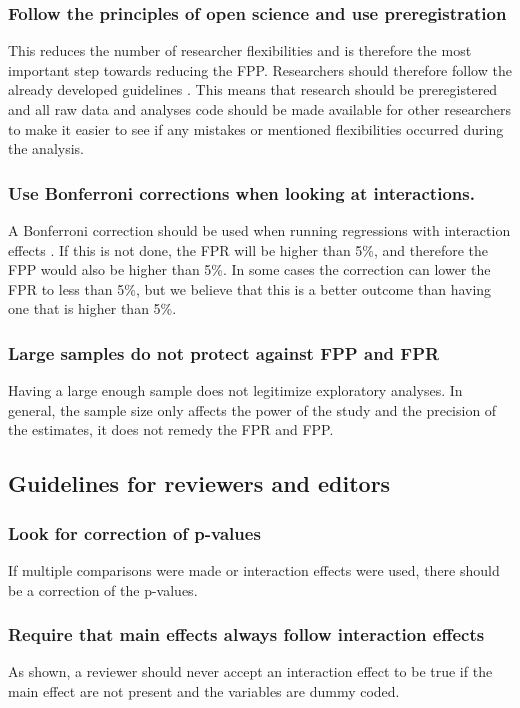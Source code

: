 \subsubsection{Follow the principles of open science and use preregistration}
This reduces the number of researcher flexibilities and is therefore the most important step towards reducing the FPP. Researchers should therefore follow the already developed guidelines \citep{Nosek2015}. This means that research should be preregistered and all raw data and analyses code should be made available for other researchers to make it easier to see if any mistakes or mentioned flexibilities occurred during the analysis. 
\subsubsection{Use Bonferroni corrections when looking at interactions.}
A Bonferroni correction should be used when running regressions with interaction effects . If this is not done, the FPR will be higher than 5\%, and therefore the FPP would also be higher than 5\%. In some cases the correction can lower the FPR to less than 5\%, but we believe that this is a better outcome than having one that is higher than 5\%. 
\subsubsection{Large samples do not protect against FPP and FPR}
Having a large enough sample does not legitimize exploratory analyses. In general, the sample size only affects the power of the study and the precision of the estimates, it does not remedy the FPR and FPP. 

\subsection{Guidelines for reviewers and editors}

\subsubsection{Look for correction of p-values}
If multiple comparisons were made or interaction effects were used, there should be a correction of the p-values.
\subsubsection{Require that main effects always follow interaction effects}
As shown, a reviewer should never accept an interaction effect to be true if the main effect are not present and the variables are dummy coded. 


